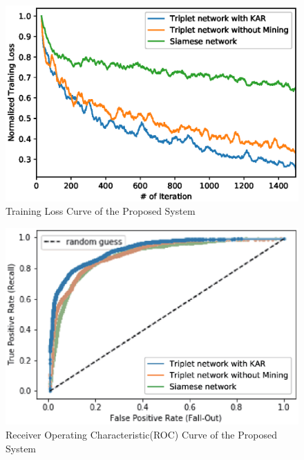 \documentclass[runningheads]{llncs}
\begin{document}
\begin{figure}
    \includegraphics[width=\textwidth]{normalized_loss_curve_ma30_v1.eps}
    \caption{Training Loss Curve of the Proposed System} \label{fig2}
\end{figure}
\begin{figure}
    \includegraphics[width=\textwidth]{fig_roc_v5.eps}
    \caption{Receiver Operating Characteristic(ROC) Curve of the Proposed System} \label{fig3}
\end{figure}
\end{document}
